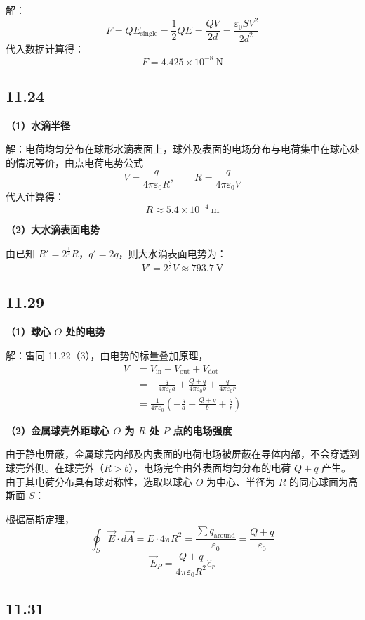 \documentclass[UTF8,a4paper,12pt]{ctexart}
\begin{document}
解：
\[
F=QE_{\text{single}}=\frac{1}{2}QE=\frac{QV}{2d}=\frac{\varepsilon_0SV^2}{2d^2}
\]
代入数据计算得：
\[
F=4.425\times10^{-8}\ \mathrm{N}
\]

\subsection*{11.24}

\textbf{（1）水滴半径}

解：电荷均匀分布在球形水滴表面上，球外及表面的电场分布与电荷集中在球心处的情况等价，由点电荷电势公式
\[
V=\frac{q}{4\pi\varepsilon_0R},
\qquad
R=\frac{q}{4\pi\varepsilon_0V}
\]
代入计算得：
\[
R\approx5.4\times10^{-4}\ \mathrm{m}
\]

\textbf{（2）大水滴表面电势}

由已知 $R'=2^{\frac{1}{3}}R$，$q'=2q$，则大水滴表面电势为：
\[
V'=2^{\frac{2}{3}}V\approx793.7\ \mathrm{V}
\]

\subsection*{11.29}

\textbf{（1）球心 $O$ 处的电势}

解：雷同 11.22（3），由电势的标量叠加原理，
\[
\begin{aligned}
V
&=
V_{\text{in}}+V_{\text{out}}+V_{\text{dot}}\\
&=
-\frac{q}{4\pi\varepsilon_0a}
+\frac{Q+q}{4\pi\varepsilon_0b}
+\frac{q}{4\pi\varepsilon_0r}\\
&=
\frac{1}{4\pi\varepsilon_0}
\left(
-\frac{q}{a}+\frac{Q+q}{b}+\frac{q}{r}
\right)
\end{aligned}
\]

\textbf{（2）金属球壳外距球心 $O$ 为 $R$ 处 $P$ 点的电场强度}

由于静电屏蔽，金属球壳内部及内表面的电荷电场被屏蔽在导体内部，不会穿透到球壳外侧。在球壳外（$R>b$），电场完全由外表面均匀分布的电荷 $Q+q$ 产生。由于其电荷分布具有球对称性，选取以球心 $O$ 为中心、半径为 $R$ 的同心球面为高斯面 $S$：

根据高斯定理，
\[
\oint_S\vec{E}\cdot d\vec{A}
=
E\cdot4\pi R^2
=
\frac{\sum q_{\text{around}}}{\varepsilon_0}
=
\frac{Q+q}{\varepsilon_0}
\]
\[
\vec{E}_P
=
\frac{Q+q}{4\pi\varepsilon_0R^2}\hat{e}_r
\]

\subsection*{11.31}
\end{document}
